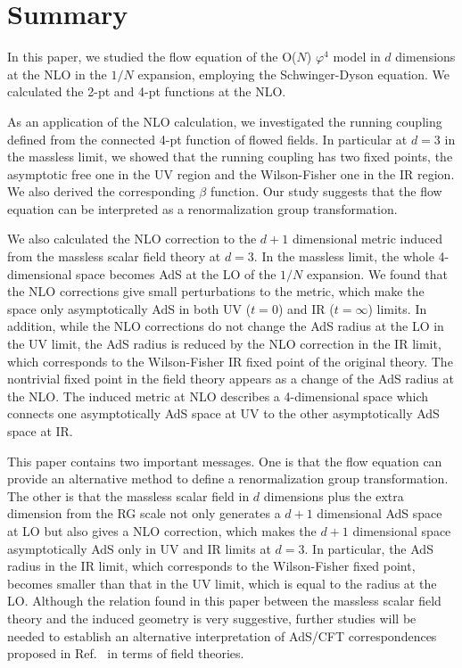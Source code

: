 \documentclass[preprint]{ptephy_v1}%
\begin{document}
 
\section{Summary}
\label{sec:summary}
In this paper, 
we studied the flow equation of the O($N$) $\varphi^4$ model in $d$ dimensions at the NLO in the $1/N$ expansion,
employing the Schwinger-Dyson equation.
We calculated the 2-pt and 4-pt functions at the NLO.

As an application of the NLO calculation,
 we investigated the running coupling defined from the connected 4-pt function of flowed fields.
In particular at $d=3$ in the massless limit, we showed that the running coupling has two fixed points, the asymptotic free one in the UV region and the Wilson-Fisher one in the IR region.
We also derived the corresponding $\beta$ function.
Our study suggests that the flow equation can be interpreted as a renormalization group transformation.

We also calculated the NLO correction to the $d+1$ dimensional metric induced  from the massless scalar field theory at $d=3$.
In the massless limit, the whole 4-dimensional space becomes AdS at the LO of the  $1/N$ expansion\cite{Aoki:2016ohw}.
We found that the NLO corrections give small perturbations to the metric,
which make the space only asymptotically AdS in both UV ($t=0$) and IR ($t=\infty$) limits.
In addition,  while the NLO corrections do not change the AdS radius at the LO in the UV limit, the AdS radius is  reduced by the NLO correction in the IR limit, which corresponds to the Wilson-Fisher IR fixed point of the original theory.  The nontrivial fixed point in the field theory appears as a change of the AdS radius at the NLO.
The induced metric at NLO describes a 4-dimensional space which connects one asymptotically AdS space at UV to the other  asymptotically AdS space at IR.

This paper contains two important messages.
One is that the flow equation can provide an alternative method  to define a renormalization group transformation.
The other is that the massless scalar field in $d$ dimensions plus  the extra dimension from  the RG scale
not only generates  a $d+1$ dimensional AdS space at  LO\cite{Aoki:2016ohw} but also 
gives a NLO correction, which makes the $d+1$ dimensional space  asymptotically AdS only in UV and IR limits at $d=3$.   In particular, the AdS radius in the IR limit, which corresponds to the Wilson-Fisher fixed point, becomes smaller than that in the UV limit, which is equal to the radius at the LO.
Although the relation found in this paper between the massless scalar field theory and the induced geometry is very suggestive, further studies will be needed to establish an alternative interpretation  of  AdS/CFT correspondences
proposed in Ref.~\cite{Aoki:2015dla} in terms of field theories.
\end{document}
